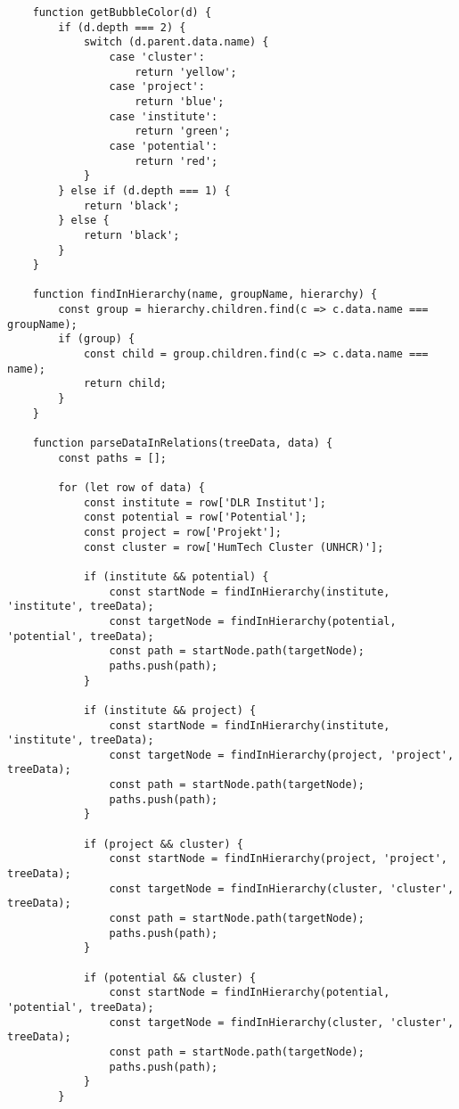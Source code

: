 {\begin{lstlisting}
    function getBubbleColor(d) {
        if (d.depth === 2) {
            switch (d.parent.data.name) {
                case 'cluster':
                    return 'yellow';
                case 'project':
                    return 'blue';
                case 'institute':
                    return 'green';
                case 'potential':
                    return 'red';
            }
        } else if (d.depth === 1) {
            return 'black';
        } else {
            return 'black';
        }
    }
    
    function findInHierarchy(name, groupName, hierarchy) {
        const group = hierarchy.children.find(c => c.data.name === groupName);
        if (group) {
            const child = group.children.find(c => c.data.name === name);
            return child;
        }
    }
    
    function parseDataInRelations(treeData, data) {
        const paths = [];
    
        for (let row of data) {
            const institute = row['DLR Institut'];
            const potential = row['Potential'];
            const project = row['Projekt'];
            const cluster = row['HumTech Cluster (UNHCR)'];
    
            if (institute && potential) {
                const startNode = findInHierarchy(institute, 'institute', treeData);
                const targetNode = findInHierarchy(potential, 'potential', treeData);
                const path = startNode.path(targetNode);
                paths.push(path);
            }
    
            if (institute && project) {
                const startNode = findInHierarchy(institute, 'institute', treeData);
                const targetNode = findInHierarchy(project, 'project', treeData);
                const path = startNode.path(targetNode);
                paths.push(path);
            }
    
            if (project && cluster) {
                const startNode = findInHierarchy(project, 'project', treeData);
                const targetNode = findInHierarchy(cluster, 'cluster', treeData);
                const path = startNode.path(targetNode);
                paths.push(path);
            }
    
            if (potential && cluster) {
                const startNode = findInHierarchy(potential, 'potential', treeData);
                const targetNode = findInHierarchy(cluster, 'cluster', treeData);
                const path = startNode.path(targetNode);
                paths.push(path);
            }
        }
    

\end{lstlisting}}
